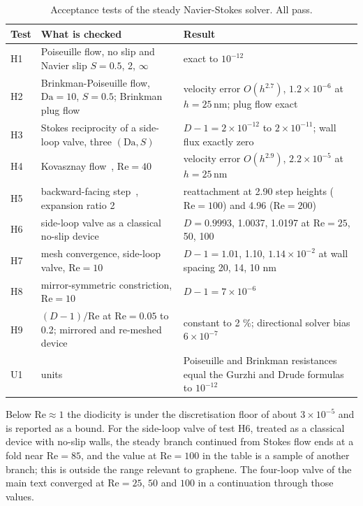 \documentclass[aps,prapplied,onecolumn,superscriptaddress,floatfix]{revtex4-2}
\newcommand{\nm}{\,\mathrm{nm}}
\begin{document}
\begin{table}[ht]
\caption{Acceptance tests of the steady Navier-Stokes solver. All pass.}
\begin{ruledtabular}
\begin{tabular}{lp{}p{}}
Test & What is checked & Result \\
\hline
H1 & Poiseuille flow, no slip and Navier slip $S=0.5$, 2, $\infty$ & exact to $10^{-12}$ \\
H2 & Brinkman-Poiseuille flow, $\mathrm{Da}=10$, $S=0.5$; Brinkman plug flow & velocity error $O(h^{2.7})$, $1.2\times10^{-6}$ at $h=25\nm$; plug flow exact \\
H3 & Stokes reciprocity of a side-loop valve, three $(\mathrm{Da},S)$ & $D-1=2\times10^{-12}$ to $2\times10^{-11}$; wall flux exactly zero \\
H4 & Kovasznay flow~\cite{kovasznay1948laminar}, $\mathrm{Re}=40$ & velocity error $O(h^{2.9})$, $2.2\times10^{-5}$ at $h=25\nm$ \\
H5 & backward-facing step~\cite{armaly1983experimental,erturk2008numerical}, expansion ratio 2 & reattachment at 2.90 step heights ($\mathrm{Re}=100$) and 4.96 ($\mathrm{Re}=200$) \\
H6 & side-loop valve as a classical no-slip device & $D=0.9993$, 1.0037, 1.0197 at $\mathrm{Re}=25$, 50, 100 \\
H7 & mesh convergence, side-loop valve, $\mathrm{Re}=10$ & $D-1=1.01$, 1.10, $1.14\times10^{-2}$ at wall spacing 20, 14, 10 nm \\
H8 & mirror-symmetric constriction, $\mathrm{Re}=10$ & $D-1=7\times10^{-6}$ \\
H9 & $(D-1)/\mathrm{Re}$ at $\mathrm{Re}=0.05$ to 0.2; mirrored and re-meshed device & constant to 2 \%; directional solver bias $6\times10^{-7}$ \\
U1 & units & Poiseuille and Brinkman resistances equal the Gurzhi and Drude formulas to $10^{-12}$ \\
\end{tabular}
\end{ruledtabular}
\end{table}

Below $\mathrm{Re}\approx1$ the diodicity is under the discretisation floor of
about $3\times10^{-5}$ and is reported as a bound. For the side-loop valve
of test H6, treated as a classical device with no-slip walls, the steady
branch continued from Stokes flow ends at a
fold near $\mathrm{Re}=85$, and the value at $\mathrm{Re}=100$ in the
table is a sample of another branch; this is outside the range relevant
to graphene. The four-loop valve of the main text converged at
$\mathrm{Re}=25$, $50$ and $100$ in a continuation through those values.
\end{document}
